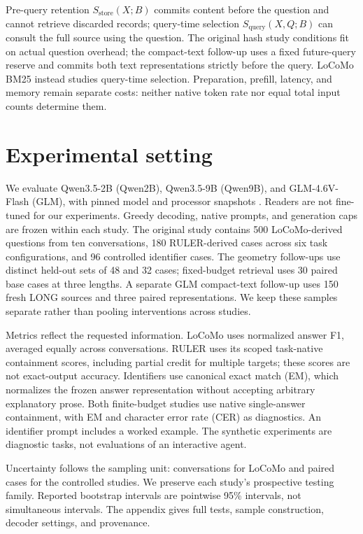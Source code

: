 \documentclass{article}
\begin{document}
Pre-query retention $S_{\mathrm{store}}(X;B)$ commits content before the question and cannot retrieve discarded records; query-time selection $S_{\mathrm{query}}(X,Q;B)$ can consult the full source using the question. The original hash study conditions fit on actual question overhead; the compact-text follow-up uses a fixed future-query reserve and commits both text representations strictly before the query. LoCoMo BM25 instead studies query-time selection. Preparation, prefill, latency, and memory remain separate costs: neither native token rate nor equal total input counts determine them.

\section{Experimental setting}
We evaluate Qwen3.5-2B (Qwen2B), Qwen3.5-9B (Qwen9B), and GLM-4.6V-Flash (GLM), with pinned model and processor snapshots \citep{qwen,glm}. Readers are not fine-tuned for our experiments. Greedy decoding, native prompts, and generation caps are frozen within each study. The original study contains 500 LoCoMo-derived questions from ten conversations, 180 RULER-derived cases across six task configurations, and 96 controlled identifier cases. The geometry follow-ups use distinct held-out sets of 48 and 32 cases; fixed-budget retrieval uses 30 paired base cases at three lengths. A separate GLM compact-text follow-up uses 150 fresh LONG sources and three paired representations. We keep these samples separate rather than pooling interventions across studies.

Metrics reflect the requested information. LoCoMo uses normalized answer F1, averaged equally across conversations. RULER uses its scoped task-native containment scores, including partial credit for multiple targets; these scores are not exact-output accuracy. Identifiers use canonical exact match (EM), which normalizes the frozen answer representation without accepting arbitrary explanatory prose. Both finite-budget studies use native single-answer containment, with EM and character error rate (CER) as diagnostics. An identifier prompt includes a worked example. The synthetic experiments are diagnostic tasks, not evaluations of an interactive agent.

Uncertainty follows the sampling unit: conversations for LoCoMo and paired cases for the controlled studies. We preserve each study's prospective testing family. Reported bootstrap intervals are pointwise 95\% intervals, not simultaneous intervals. The appendix gives full tests, sample construction, decoder settings, and provenance. 
\end{document}
